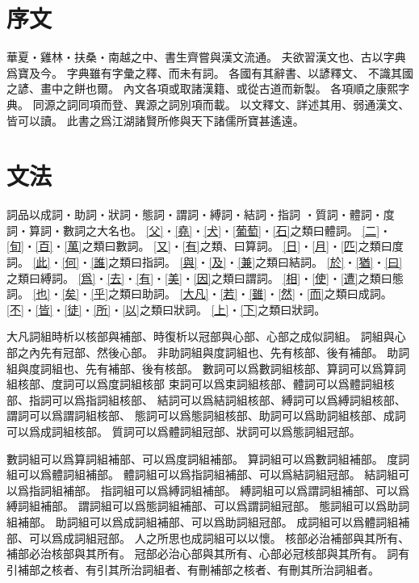 \chapter*{序文}
華夏・雞林・扶桑・南越之中、書生齊嘗與漢文流通。
夫欲習漢文也、古以字典爲寶及今。
字典雖有字彙之釋、而未有詞。
各國有其辭書、以諺釋文、
不識其國之諺、畫中之餅也爾。
內文各項或取諸漢籍、或從古道而新製。
各項順之康熙字典。
同源之詞同項而登、異源之詞別項而載。
以文釋文、詳述其用、弱通漢文、皆可以讀。
此書之爲江湖諸賢所修與天下諸儒所寶甚遙遠。
\chapter*{文法}
詞品以成詞・助詞・狀詞・態詞・謂詞・縛詞・結詞・指詞
・質詞・體詞・度詞・算詞・數詞之大名也。
\cref{父}・\cref{堯}・\cref{犬}・\cref{葡萄}・\cref{石}之類曰體詞。
\cref{二}・\cref{旬}・\cref{百}・\cref{萬}之類曰數詞。
\cref{又}・\cref{有}之類、曰算詞。
\cref{日}・\cref{月}・\cref{匹}之類曰度詞。
\cref{此}・\cref{何}・\cref{誰}之類曰指詞。
\cref{與}・\cref{及}・\cref{兼}之類曰結詞。
\cref{於}・\cref{猶}・\cref{曰}之類曰縛詞。
\cref{爲}・\cref{去}・\cref{有}・\cref{美}・\cref{因}之類曰謂詞。
\cref{相}・\cref{使}・\cref{遭}之類曰態詞。
\cref{也}・\cref{矣}・\cref{乎}之類曰助詞。
\cref{大凡}・\cref{若}・\cref{雖}・\cref{然}・\cref{而}之類曰成詞。
\cref{不}・\cref{皆}・\cref{徒}・\cref{所}・\cref{以}之類曰狀詞。
\cref{上}・\cref{下}之類曰狀詞。

大凡詞組時析以核部與補部、時復析以冠部與心部、心部之成似詞組。
詞組與心部之內先有冠部、然後心部。
非助詞組與度詞組也、先有核部、後有補部。
助詞組與度詞組也、先有補部、後有核部。
數詞可以爲數詞組核部、算詞可以爲算詞組核部、度詞可以爲度詞組核部
束詞可以爲束詞組核部、體詞可以爲體詞組核部、指詞可以爲指詞組核部、
結詞可以爲結詞組核部、縛詞可以爲縛詞組核部、謂詞可以爲謂詞組核部、
態詞可以爲態詞組核部、助詞可以爲助詞組核部、成詞可以爲成詞組核部。
質詞可以爲體詞組冠部、狀詞可以爲態詞組冠部。

數詞組可以爲算詞組補部、可以爲度詞組補部。
算詞組可以爲數詞組補部。
度詞組可以爲體詞組補部。
體詞組可以爲指詞組補部、可以爲結詞組冠部。
結詞組可以爲指詞組補部。
指詞組可以爲縛詞組補部。
縛詞組可以爲謂詞組補部、可以爲縛詞組補部。
謂詞組可以爲態詞組補部、可以爲謂詞組冠部。
態詞組可以爲助詞組補部。
助詞組可以爲成詞組補部、可以爲助詞組冠部。
成詞組可以爲體詞組補部、可以爲成詞組冠部。
人之所思也成詞組可以以懷。
核部必治補部與其所有、補部必治核部與其所有。
冠部必治心部與其所有、心部必冠核部與其所有。
詞有引補部之核者、有引其所治詞組者、有刪補部之核者、有刪其所治詞組者。
